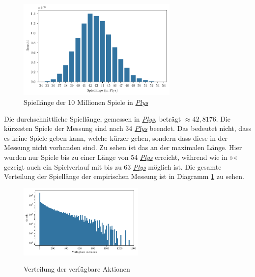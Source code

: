 \begin{figure}[!ht]
    \centering
    \includegraphics[width=0.7\textwidth]{res/pictures/plots/game_lengths.pdf}
    \caption{Spiellänge der 10 Millionen Spiele in \hyperref[text:ply]{\emph{Plys}}}
    \label{fig:plot-game-length-10-million}
\end{figure}

Die durchschnittliche Spiellänge, gemessen in \hyperref[text:ply]{\emph{Plys}}, beträgt ${\approx}42{,}8176$. Die kürzesten Spiele der Messung sind nach 34 \hyperref[text:ply]{\emph{Plys}} beendet. Das bedeutet nicht, dass es keine Spiele geben kann, welche kürzer gehen, sondern dass diese in der Messung nicht vorhanden sind. Zu sehen ist das an der maximalen Länge. Hier wurden nur Spiele bis zu einer Länge von 54 \hyperref[text:ply]{\emph{Plys}} erreicht, während wie in »« gezeigt auch ein Spielverlauf mit bis zu 63 \hyperref[text:ply]{\emph{Plys}} möglich ist. Die gesamte Verteilung der Spiellänge der empirischen Messung ist in Diagramm \ref{fig:plot-game-length-10-million} zu sehen.

\pagebreak

\begin{figure}
    \centering
    \includegraphics[width=0.549\textwidth]{res/pictures/plots/available_actions.pdf}
    \vspace{-7pt}
    \caption[Verteilung der verfügbare Aktionen]{\unskip}
    Verteilung der verfügbare Aktionen
    \label{fig:plot-available-actions-10-million}
    \vspace{-7pt}
\end{figure}


